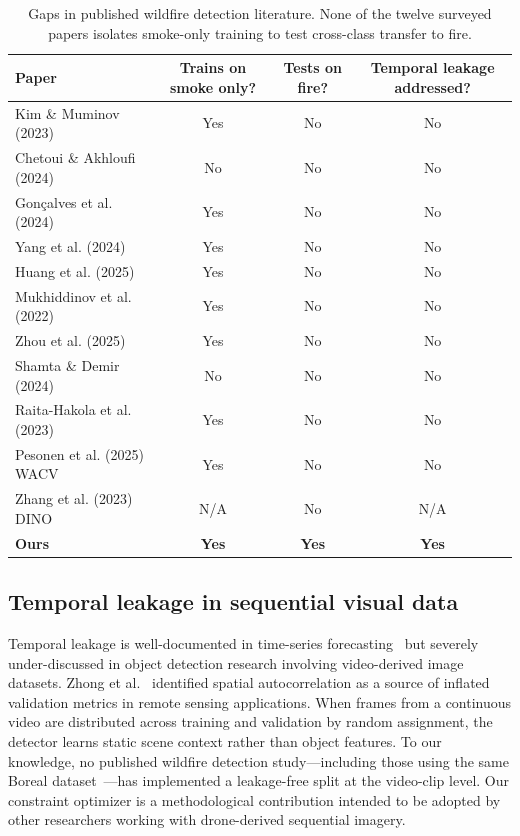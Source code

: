 \documentclass[10pt,twocolumn]{article}
\begin{document}
\begin{table}[H]
\centering
\caption{Gaps in published wildfire detection literature. None of the twelve surveyed papers isolates smoke-only training to test cross-class transfer to fire.}
\label{tab:lit_gaps}
\small
\begin{tabular}{@{}p{}ccc@{}}
\toprule
\textbf{Paper} & \textbf{Trains on smoke only?} & \textbf{Tests on fire?} & \textbf{Temporal leakage addressed?} \\
\midrule
Kim \& Muminov (2023)       & Yes & No  & No \\
Chetoui \& Akhloufi (2024)  & No  & No  & No \\
Gon{\c{c}}alves et al. (2024)   & Yes & No  & No \\
Yang et al. (2024)          & Yes & No  & No \\
Huang et al. (2025)         & Yes & No  & No \\
Mukhiddinov et al. (2022)   & Yes & No  & No \\
Zhou et al. (2025)          & Yes & No  & No \\
Shamta \& Demir (2024)      & No  & No  & No \\
Raita-Hakola et al. (2023)  & Yes & No  & No \\
Pesonen et al. (2025) WACV  & Yes & No  & No \\
Zhang et al. (2023) DINO    & N/A & No  & N/A \\
\textbf{Ours}               & \textbf{Yes} & \textbf{Yes} & \textbf{Yes} \\
\bottomrule
\end{tabular}
\end{table}

\subsection{Temporal leakage in sequential visual data}

Temporal leakage is well-documented in time-series forecasting~\cite{tran2019frame} but severely under-discussed in object detection research involving video-derived image datasets. Zhong et al.~\cite{zhong2020spatial} identified spatial autocorrelation as a source of inflated validation metrics in remote sensing applications. When frames from a continuous video are distributed across training and validation by random assignment, the detector learns static scene context rather than object features. To our knowledge, no published wildfire detection study---including those using the same Boreal dataset~\cite{raita2023combining,pesonen2025detecting}---has implemented a leakage-free split at the video-clip level. Our constraint optimizer is a methodological contribution intended to be adopted by other researchers working with drone-derived sequential imagery.
\end{document}
